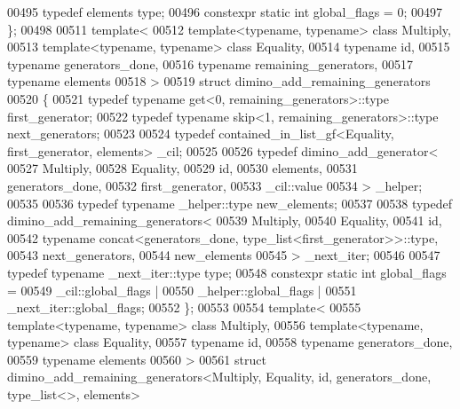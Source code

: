 \begin{DoxyCode}
00495   \textcolor{keyword}{typedef} elements type;
00496   constexpr \textcolor{keyword}{static} \textcolor{keywordtype}{int} global\_flags = 0;
00497 \};
00498 
00511 \textcolor{keyword}{template}<
00512   \textcolor{keyword}{template}<\textcolor{keyword}{typename}, \textcolor{keyword}{typename}> \textcolor{keyword}{class }Multiply,
00513   \textcolor{keyword}{template}<\textcolor{keyword}{typename}, \textcolor{keyword}{typename}> \textcolor{keyword}{class }Equality,
00514   \textcolor{keyword}{typename} id,
00515   \textcolor{keyword}{typename} generators\_done,
00516   \textcolor{keyword}{typename} remaining\_generators,
00517   \textcolor{keyword}{typename} elements
00518 >
00519 \textcolor{keyword}{struct }dimino\_add\_remaining\_generators
00520 \{
00521   \textcolor{keyword}{typedef} \textcolor{keyword}{typename} get<0, remaining\_generators>::type first\_generator;
00522   \textcolor{keyword}{typedef} \textcolor{keyword}{typename} skip<1, remaining\_generators>::type next\_generators;
00523 
00524   \textcolor{keyword}{typedef} contained\_in\_list\_gf<Equality, first\_generator, elements> \_cil;
00525 
00526   \textcolor{keyword}{typedef} dimino\_add\_generator<
00527     Multiply,
00528     Equality,
00529     id,
00530     elements,
00531     generators\_done,
00532     first\_generator,
00533     \_cil::value
00534   > \_helper;
00535 
00536   \textcolor{keyword}{typedef} \textcolor{keyword}{typename} \_helper::type new\_elements;
00537 
00538   \textcolor{keyword}{typedef} dimino\_add\_remaining\_generators<
00539     Multiply,
00540     Equality,
00541     id,
00542     \textcolor{keyword}{typename} concat<generators\_done, type\_list<first\_generator>>::type,
00543     next\_generators,
00544     new\_elements
00545   > \_next\_iter;
00546 
00547   \textcolor{keyword}{typedef} \textcolor{keyword}{typename} \_next\_iter::type type;
00548   constexpr \textcolor{keyword}{static} \textcolor{keywordtype}{int} global\_flags =
00549     \_cil::global\_flags |
00550     \_helper::global\_flags |
00551     \_next\_iter::global\_flags;
00552 \};
00553 
00554 \textcolor{keyword}{template}<
00555   \textcolor{keyword}{template}<\textcolor{keyword}{typename}, \textcolor{keyword}{typename}> \textcolor{keyword}{class }Multiply,
00556   \textcolor{keyword}{template}<\textcolor{keyword}{typename}, \textcolor{keyword}{typename}> \textcolor{keyword}{class }Equality,
00557   \textcolor{keyword}{typename} id,
00558   \textcolor{keyword}{typename} generators\_done,
00559   \textcolor{keyword}{typename} elements
00560 >
00561 \textcolor{keyword}{struct }dimino\_add\_remaining\_generators<Multiply, Equality, id, generators\_done, type\_list<>, elements>

\end{DoxyCode}
